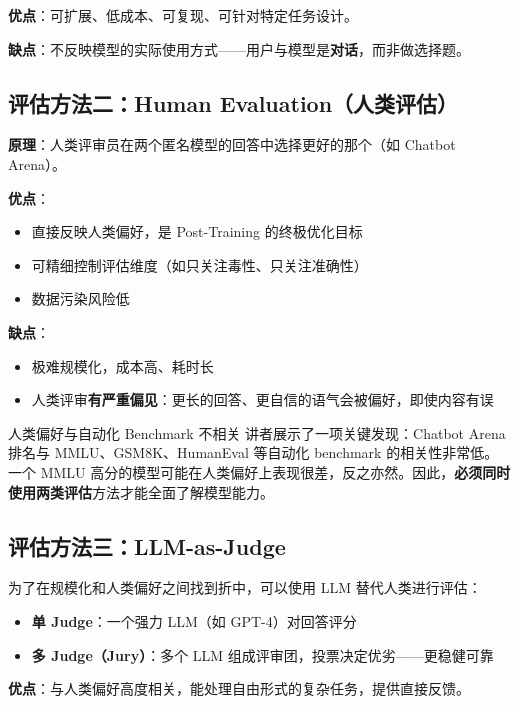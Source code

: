 \documentclass[a4paper]{article}
\begin{document}
\textbf{优点}：可扩展、低成本、可复现、可针对特定任务设计。

\textbf{缺点}：不反映模型的实际使用方式——用户与模型是\textbf{对话}，而非做选择题。

\subsection{评估方法二：Human Evaluation（人类评估）}

\textbf{原理}：人类评审员在两个匿名模型的回答中选择更好的那个（如 Chatbot Arena）。

\textbf{优点}：
\begin{itemize}
    \item 直接反映人类偏好，是 Post-Training 的终极优化目标
    \item 可精细控制评估维度（如只关注毒性、只关注准确性）
    \item 数据污染风险低
\end{itemize}

\textbf{缺点}：
\begin{itemize}
    \item 极难规模化，成本高、耗时长
    \item 人类评审\textbf{有严重偏见}：更长的回答、更自信的语气会被偏好，即使内容有误
\end{itemize}

\begin{warningbox}{人类偏好与自动化 Benchmark 不相关}
讲者展示了一项关键发现：Chatbot Arena 排名与 MMLU、GSM8K、HumanEval 等自动化 benchmark 的相关性非常低。一个 MMLU 高分的模型可能在人类偏好上表现很差，反之亦然。因此，\textbf{必须同时使用两类评估}方法才能全面了解模型能力。
\end{warningbox}

\subsection{评估方法三：LLM-as-Judge}

为了在规模化和人类偏好之间找到折中，可以使用 LLM 替代人类进行评估：

\begin{itemize}
    \item \textbf{单 Judge}：一个强力 LLM（如 GPT-4）对回答评分
    \item \textbf{多 Judge（Jury）}：多个 LLM 组成评审团，投票决定优劣——更稳健可靠
\end{itemize}

\textbf{优点}：与人类偏好高度相关，能处理自由形式的复杂任务，提供直接反馈。
\end{document}
